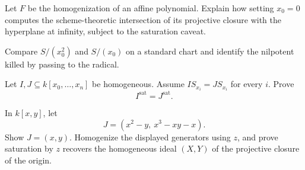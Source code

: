 \begin{exercise}\label{exr:vi37-23}
Let \(F\) be the homogenization of an affine polynomial. Explain how setting \(x_0=0\) computes the scheme-theoretic intersection of its projective closure with the hyperplane at infinity, subject to the saturation caveat.
\end{exercise}
\begin{exercise}\label{exr:vi37-24}
Compare \(S/(x_0^2)\) and \(S/(x_0)\) on a standard chart and identify the nilpotent killed by passing to the radical.
\end{exercise}
\begin{exercise}\label{exr:vi37-25}
Let \(I,J\subseteq k[x_0,\ldots,x_n]\) be homogeneous. Assume \(IS_{x_i}=JS_{x_i}\) for every \(i\). Prove
\[
I^{\mathrm{sat}}=J^{\mathrm{sat}}.
\]
\end{exercise}
\begin{exercise}\label{exr:vi37-26}
In \(k[x,y]\), let
\[
J=(x^2-y,\ x^3-xy-x).
\]
Show \(J=(x,y)\). Homogenize the displayed generators using \(z\), and prove saturation by \(z\) recovers the homogeneous ideal \((X,Y)\) of the projective closure of the origin.
\end{exercise}
